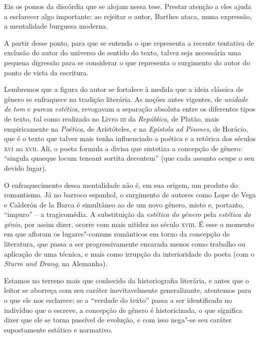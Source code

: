 Eis os pomos da discórdia que se alojam nessa tese. Prestar atenção a
eles ajuda a esclarecer algo importante: ao rejeitar o autor, Barthes
ataca, numa expressão, a mentalidade burguesa moderna.

A partir desse ponto, para que se entenda o que representa a recente
tentativa de exclusão do autor do universo de sentido do texto, talvez
seja necessária uma pequena digressão para se considerar o que
representa o surgimento do autor do ponto de vista da escritura.

Lembremos que a figura do autor se fortalece à medida que a ideia
clássica de gênero se enfraquece na tradição literária. As noções antes
vigentes, de \emph{unidade de tom} e \emph{pureza estética}, revogavam a separação
absoluta entre os diferentes tipos de texto, tal como realizado no Livro
\textsc{iii} da \emph{República}, de Platão, mais empiricamente na \emph{Poética}, de
Aristóteles, e na \emph{Epistola ad Pisones}, de Horácio, que é o texto que
talvez mais tenha influenciado a poética e a retórica dos séculos
\textsc{xvi} ao \textsc{xvii}. Ali, o poeta formula a divisa que
sintetiza a concepção de gênero: ``singula quaeque locum teneant sortita
decentem'' (que cada assunto ocupe o seu devido lugar).

O enfraquecimento dessa mentalidade não é, em sua origem, um produto do
romantismo. Já no barroco espanhol, o surgimento de autores como Lope de
Vega e Calderón de la Barca é simultâneo ao de um novo gênero, misto e,
portanto, ``impuro'' -- a tragicomédia. A substituição da \emph{estética do
gênero} pela \emph{estética do gênio}, por assim dizer, ocorre com mais nitidez
no século \textsc{xviii}. É esse o momento em que afloram os
lugares"-comuns românticos em torno da concepção de literatura, que passa
a ser progressivamente encarada menos como trabalho ou aplicação de uma
técnica, e mais como irrupção da interioridade do poeta (com o \emph{Sturm und
Drang}, na Alemanha).

Estamos no terreno mais que conhecido da historiografia literária, e
antes que o leitor se aborreça com seu caráter inevitavelmente
generalizante, atentemos para o que ele nos esclarece: se a ``verdade do
texto'' passa a ser identificada no indivíduo que o escreve, a concepção
de gênero é historicizada, o que significa dizer que ele se torna
passível de evolução, e com isso nega"-se seu caráter supostamente
estático e normativo.

